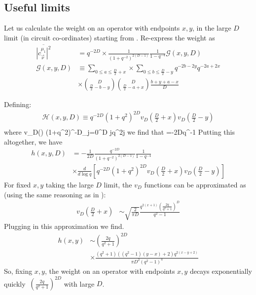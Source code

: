\documentclass[aps,prb,twocolumn,superscriptaddress]{revtex4-1}
\begin{document}
\subsection{Useful limits}
Let us calculate the weight on an operator with endpoints $x,y$, in the large $D$ limit (in circuit co-ordinates) starting from . Re-express the weight as
\begin{align*}
\overline{\left|c_{\vec{\nu}}^{\mu_{1}}\right|^{2}} & =q^{-2D}\times\frac{1}{\left(1+q^{-2}\right)^{2(D-1)}}\frac{1}{1-q^{-4}}\mathcal{G}\left(x,y,D\right)\\
\mathcal{G}\left(x,y,D\right) & \equiv\sum_{0\leq a\leq\frac{D}{2}+x}\times\sum_{0\leq b\leq\frac{D}{2}-y}q^{-2b-2y}q^{-2a+2x}\\
&\times\binom{D}{\frac{D}{2}-b-y}\binom{D}{\frac{D}{2}-a+x}\frac{b+y+a-x}{D}
\end{align*}

Defining:
\begin{align*}
\mathcal{H}(x,y,D) \equiv q^{-2D}(1+q^{2})^{2D}v_{D}(\frac{D}{2}+x)v_{D}(\frac{D}{2}-y)\\
\end{align*}
where 
\be
v_{D}(\Delta) \equiv (1+q^{2})^{-D}\sum_{j=0}^{\Delta}{D \choose j}q^{2j}
\ee
we find that
\be
{} =-2Dq^{-1}\times{}
\ee
Putting this altogether, we have
\begin{align}
h(x,y,D) & =-\frac{1}{2D}\frac{q^{-2D}}{\left(1+q^{-2}\right)^{2(D-1)}}\frac{1}{1-q^{-4}} \nonumber\\
&\times\frac{d}{d\log q}[q^{-2D}(1+q^{2})^{2D}v_{D}(\frac{D}{2}+x)v_{D}(\frac{D}{2}-y)] \label{hfunct}
\end{align}
For fixed $x,y$ taking the large $D$ limit, the $v_D$ functions can be approximated as (using the same reasoning as in  ):
\begin{align*}
v_{D}(\frac{D}{2}+x) & \sim\sqrt{\frac{2}{\pi D}}\frac{q^{2(x+1)}\left(\frac{2q}{q^{2}+1}\right)^{D}}{q^{2}-1}
\end{align*}
Plugging in this approximation we find.
\begin{align}
h(x,y)  &\sim \left(\frac{2q}{q^{2}+1}\right)^{2D}\nonumber\\
&\times\frac{(q^{2}+1)((q^{2}-1)(y-x)+2)q^{2(x-y+2)}}{\pi D^{2}\left(q^{2}-1\right)^{4}} \label{eq:operatorweight}
\end{align}
So, fixing $x,y$, the weight on an operator with endpoints $x,y$ decays exponentially quickly $~\left(\frac{2q}{q^{2}+1}\right)^{2D}$ with large $D$. 
\end{document}
